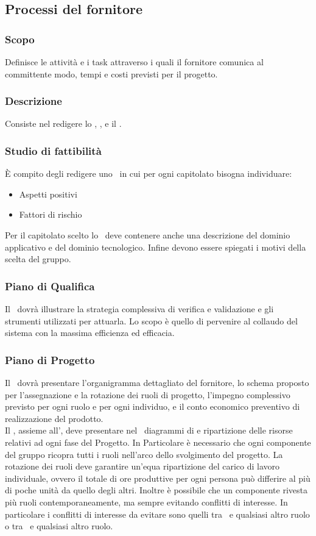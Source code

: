 \documentclass[12pt,a4paper]{article}
\begin{document}
\subsection{Processi del fornitore}


\subsubsection{Scopo}
Definisce le attività e i task attraverso i quali il fornitore comunica al committente modo, tempi e costi previsti per il progetto.

\subsubsection{Descrizione}
Consiste nel redigere lo \SdF, \PdQ, e il \PdP.

\subsubsection{Studio di fattibilità}
È compito degli \ANpl{} redigere uno \SdF\ in cui per ogni capitolato bisogna individuare:
\begin{itemize}
	\item Aspetti positivi
	\item Fattori di rischio
\end{itemize}
Per il capitolato scelto lo \SdF\ deve contenere anche una descrizione del dominio applicativo e del dominio tecnologico. Infine devono essere spiegati i motivi della scelta del gruppo.

\subsubsection{Piano di Qualifica}
Il \PdQ\ dovrà illustrare la strategia complessiva di verifica e validazione e gli strumenti utilizzati per attuarla. Lo scopo è quello di pervenire al collaudo del sistema con la massima efficienza ed efficacia.

\subsubsection{Piano di Progetto} %
Il \PdP\ dovrà presentare l'organigramma dettagliato del fornitore, lo schema proposto per l'assegnazione e la rotazione dei ruoli di progetto, l'impegno complessivo previsto per ogni ruolo e per ogni individuo, e il conto economico preventivo di realizzazione del prodotto.\\
Il \PM, assieme all'\AM, deve presentare nel \PdP\ diagrammi di  e ripartizione delle risorse relativi ad ogni fase del Progetto. In Particolare è necessario che ogni componente del gruppo ricopra tutti i ruoli nell'arco dello svolgimento del progetto. La rotazione dei ruoli deve garantire un'equa ripartizione del carico di lavoro individuale, ovvero il totale di ore produttive per ogni persona può differire al più di poche unità da quello degli altri. Inoltre è possibile che un componente rivesta più ruoli contemporaneamente, ma sempre evitando conflitti di interesse. In particolare i conflitti di interesse da evitare sono quelli tra \PM\ e qualsiasi altro ruolo o tra \VR\ e qualsiasi altro ruolo.
\end{document}
